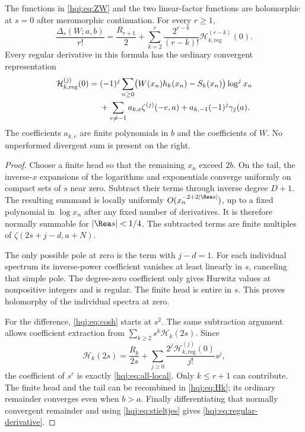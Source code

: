 \begin{theorem}\label{hqj:thm:local}
The functions in \eqref{hqj:eq:ZW} and the two linear-factor functions are
holomorphic at $s=0$ after meromorphic continuation. For every $r\ge1$,
\begin{equation}\label{hqj:eq:all-local}
\boxed{\quad
\frac{\Delta_r(W;a,b)}{r!}
=\frac{R_{r+1}}2+
\sum_{k=2}^r\frac{2^{r-k}}{(r-k)!}
\mathcal H_{k,\mathrm{reg}}^{(r-k)}(0).
\quad}
\end{equation}
Every regular derivative in this formula has the ordinary convergent
representation
\begin{align}
\mathcal H_{k,\mathrm{reg}}^{(j)}(0)
={}&(-1)^j\sum_{n\ge0}\bigl(W(x_n)h_k(x_n)-S_k(x_n)\bigr)\log^j x_n
\notag\\
&+\sum_{e\ne-1}a_{k,e}\zeta^{(j)}(-e,a)
+a_{k,-1}(-1)^j\gamma_j(a).
\label{hqj:eq:regular-derivative}
\end{align}
The coefficients $a_{k,e}$ are finite polynomials in $b$ and the
coefficients of $W$. No unperformed divergent sum is present on the right.
\end{theorem}
\begin{proof}
Choose a finite head so that the remaining $x_n$ exceed $2b$. On the tail,
the inverse-$x$ expansions of the logarithms and exponentials converge
uniformly on compact sets of $s$ near zero. Subtract their terms through
inverse degree $D+1$. The resulting summand is locally uniformly
$O(x_n^{-2+2|\Rea s|})$, up to a fixed polynomial in $\log x_n$ after
any fixed number of derivatives. It is therefore normally summable for
$|\Rea s|<1/4$. The subtracted terms are finite multiples of
$\zeta(2s+j-d,a+N)$.

The only possible pole at zero is the term with $j-d=1$.
For each individual spectrum its inverse-power coefficient vanishes at
least linearly in $s$, canceling that simple pole. The degree-zero
coefficient only gives Hurwitz values at nonpositive integers and is
regular. The finite head is entire in $s$. This proves holomorphy of
the individual spectra at zero.

For the difference, \eqref{hqj:eq:cosh} starts at $s^2$. The same
subtraction argument allows coefficient extraction from
$\sum_{k\ge2}s^k\mathcal H_k(2s)$. Since
\[
\mathcal H_k(2s)=\frac{R_k}{2s}
+\sum_{j\ge0}\frac{2^j\mathcal H_{k,\mathrm{reg}}^{(j)}(0)}{j!}s^j,
\]
the coefficient of $s^r$ is exactly \eqref{hqj:eq:all-local}.
Only $k\le r+1$ can contribute. The finite head and the tail can be
recombined in \eqref{hqj:eq:Hk}; its ordinary remainder converges even
when $b>a$. Finally differentiating that normally convergent remainder
and using \eqref{hqj:eq:stieltjes} gives
\eqref{hqj:eq:regular-derivative}.
\end{proof}

